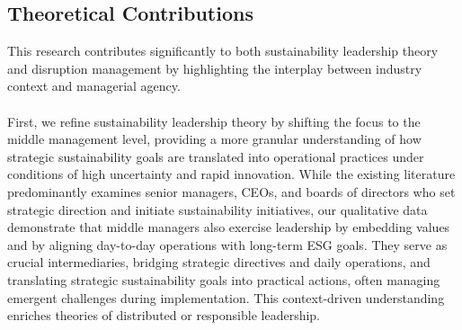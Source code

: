 	\subsection{Theoretical Contributions}
	This research contributes significantly to both sustainability leadership theory and disruption management by highlighting the interplay between industry context and managerial agency.
	
	\paragraph*{} First, we refine sustainability leadership theory by shifting the focus to the middle management level, providing a more granular understanding of how strategic sustainability goals are translated into operational practices under conditions of high uncertainty and rapid innovation. While the existing literature predominantly examines senior managers, CEOs, and boards of directors who set strategic direction and initiate sustainability initiatives, our qualitative data demonstrate that middle managers also exercise leadership by embedding values and by aligning day-to-day operations with long-term ESG goals. They serve as crucial intermediaries, bridging strategic directives and daily operations, and translating strategic sustainability goals into practical actions, often managing emergent challenges during implementation. This context-driven understanding enriches theories of distributed or responsible leadership.
	
